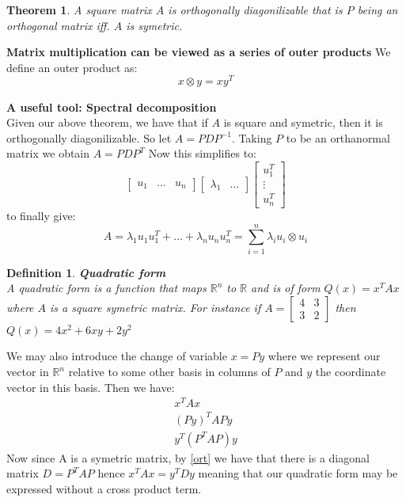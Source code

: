\documentclass[titlepage]{article}
\newcommand{\tens}[1]{%
  \mathbin{\mathop{\otimes}\limits_{#1}}%
}
\newtheorem{thm}{Theorem}[subsection]
\newtheorem{definition}{Definition}[subsection]
\numberwithin{equation}{subsection}
\newcommand{\Rn}{\mathbb{R}^n}
\begin{document}
\begin{thm}
A square matrix $A$ is orthogonally diagonilizable that is $P$ being an orthogonal matrix iff. $A$ is symetric.
\end{thm}

\begin{remark}\textbf{Matrix multiplication can be viewed as a series of outer products}
We define an outer product as:
$$ x\tens{} y = xy^{T}$$
\end{remark}

\begin{tcolorbox}
\textbf{A useful tool: Spectral decomposition}
\\

Given our above theorem, we have that if $A$ is square and symetric, then it is orthogonally diagonilizable. So let $A = PDP^{-1}$. Taking $P$ to be an orthanormal matrix we obtain $A = PDP^{T}$ Now this simplifies to:
$$\begin{bmatrix}
    u_{1} & \hdots & u_{n}
\end{bmatrix}\begin{bmatrix}
    \lambda_{1} & \hdots
\end{bmatrix} \begin{bmatrix}
    u_{1}^{T}\\
    \vdots \\
    u_{n}^{T}
\end{bmatrix}$$
to finally give:
$$A = \lambda_{1}u_{1}u_{1}^{T} + \hdots + \lambda_{n}u_{n}u_{n}^{T} = \sum_{i=1}^{n}\lambda_{i}u_{i} \tens{} u_{i}$$
\end{tcolorbox}

\begin{definition} \textbf{Quadratic form}
\\
A quadratic form is a function that maps $\Rn$ to $\mathbb{R}$ and is of form $Q(x) = x^{T}Ax$ where $A$ is a square symetric matrix. For instance if $A = \begin{bmatrix}
    4 & 3\\
    3 & 2
\end{bmatrix}$ then $Q(x) = 4x^{2} + 6xy + 2y^{2}$ 
\end{definition}

We may also introduce the change of variable $x = Py$ where we represent our vector in $\Rn$ relative to some other basis in columns of $P$ and $y$ the coordinate vector in this basis. Then we have:
\begin{align*}
    x^{T}Ax\\
    (Py)^{T}APy\\
    y^{T}(P^{T}AP)y
\end{align*}
Now since A is a symetric matrix, by \ref{ort} we have that there is a diagonal matrix $D = P^{T}AP$ hence $x^{T}Ax = y^{T}Dy$ meaning that our quadratic form may be expressed without a cross product term. 
\end{document}
